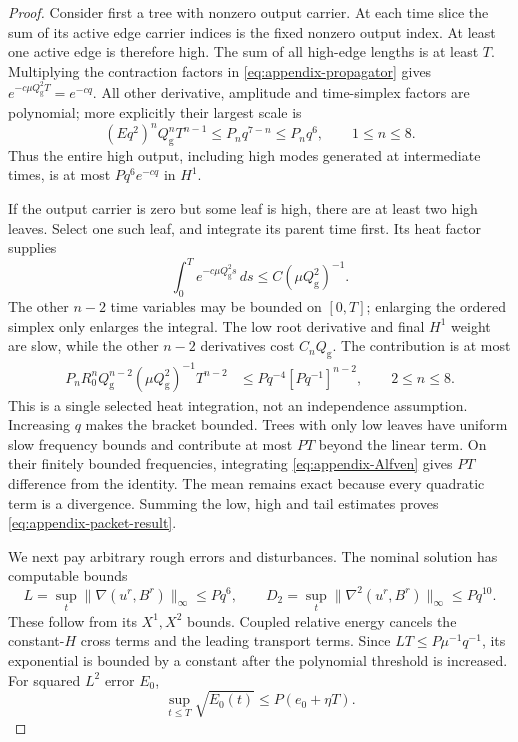\documentclass[11pt,a4paper]{amsart}
\theoremstyle{definition}
\theoremstyle{remark}
\numberwithin{equation}{section}
\newcommand{\norm}[1]{\lVert #1\rVert}
\begin{document}
\begin{proof}
Consider first a tree with nonzero output carrier.  At each time slice the
sum of its active edge carrier indices is the fixed nonzero output index.
At least one active edge is therefore high.  The sum of all high-edge
lengths is at least $T$.  Multiplying the contraction factors in
\eqref{eq:appendix-propagator} gives $e^{-c\mu Q_{\mathrm g}^2T}=e^{-cq}$.
All other derivative, amplitude and time-simplex factors are polynomial;
more explicitly their largest scale is
\[
 (Eq^2)^nQ_{\mathrm g}^nT^{n-1}\le P_nq^{7-n}\le P_nq^6,
 \qquad 1\le n\le8.
\]
Thus the entire high output, including high modes generated at intermediate
times, is at most $Pq^6e^{-cq}$ in $H^1$.

If the output carrier is zero but some leaf is high, there are at least two
high leaves.  Select one such leaf, and integrate its parent time first.
Its heat factor supplies
\[
 \int_0^T e^{-c\mu Q_{\mathrm g}^2s}\,ds\le C(\mu Q_{\mathrm g}^2)^{-1}.
\]
The other $n-2$ time variables may be bounded on $[0,T]$; enlarging the
ordered simplex only enlarges the integral.  The low root derivative and
final $H^1$ weight are slow, while the other $n-2$ derivatives cost $C_nQ_{\mathrm g}$.
The contribution is at most
\begin{align}\label{eq:appendix-low-high-tree}
 P_nR_0^n Q_{\mathrm g}^{n-2}(\mu Q_{\mathrm g}^2)^{-1}T^{n-2}
 &\le Pq^{-4}[Pq^{-1}]^{n-2},\qquad2\le n\le8.
\end{align}
This is a single selected heat integration, not an independence assumption.
Increasing $q$ makes the bracket bounded.  Trees with only low leaves have
uniform slow frequency bounds and contribute at most $PT$ beyond the linear
term.  On their finitely bounded frequencies, integrating
\eqref{eq:appendix-Alfven} gives $PT$ difference from the identity.  The
mean remains exact because every quadratic term is a divergence.  Summing
the low, high and tail estimates proves \eqref{eq:appendix-packet-result}.

We next pay arbitrary rough errors and disturbances.  The nominal solution
has computable bounds
\begin{equation}\label{eq:appendix-gradient-bounds}
 L=\sup_t\norm{\nabla(u^r,B^r)}_\infty\le Pq^6,
 \qquad D_2=\sup_t\norm{\nabla^2(u^r,B^r)}_\infty\le Pq^{10}.
\end{equation}
These follow from its $X^1,X^2$ bounds.  Coupled relative energy cancels the
constant-$H$ cross terms and the leading transport terms.  Since
$LT\le P\mu^{-1}q^{-1}$, its exponential is bounded by a constant after
the polynomial threshold is increased.  For squared $L^2$ error $E_0$,
\begin{equation}\label{eq:appendix-L2-error}
 \sup_{t\le T}\sqrt{E_0(t)}\le P(e_0+\eta T).
\end{equation}


\end{proof}
\end{document}
